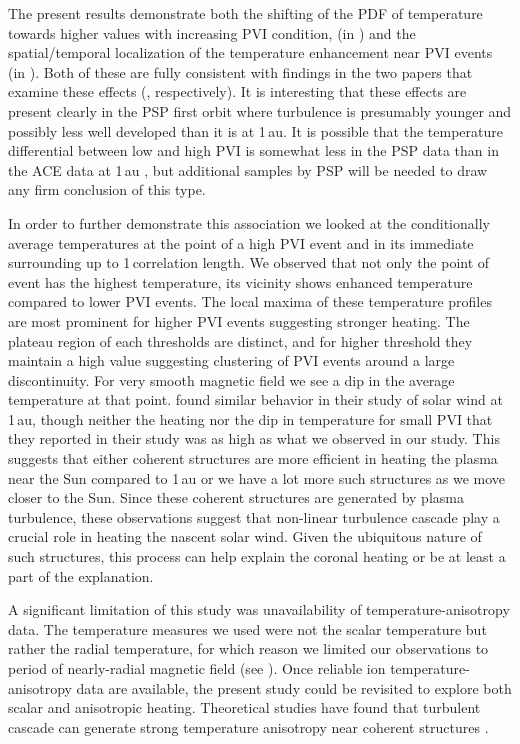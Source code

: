         The present results demonstrate both the shifting of the PDF of temperature towards higher
        values with increasing PVI condition, (in ) and the spatial/temporal
        localization of the temperature enhancement near PVI events (in ).
        Both of these are fully consistent with findings in the two papers that examine these
        effects (\citet{Osman2011, Osman2012}, respectively). It is interesting that these effects
        are present clearly in the PSP first orbit where turbulence is presumably younger and
        possibly less well developed than it is at 1\,au. It is possible that the temperature
        differential between low and high PVI is somewhat less in the PSP data than in the ACE data
        at 1\,au \citep{Osman2011}, but additional samples by PSP will be needed to draw any firm
        conclusion of this type.

        In order to further demonstrate this association we looked at the conditionally average
        temperatures at the point of a high PVI event and in its immediate surrounding up to
        1\,correlation length. We observed that not only the point of event has the highest
        temperature, its vicinity shows enhanced temperature compared to lower PVI events. The local
        maxima of these temperature profiles are most prominent for higher PVI events suggesting
        stronger heating. The plateau region of each thresholds are distinct, and for higher
        threshold they maintain a high value suggesting clustering of PVI events around a large
        discontinuity. For very smooth magnetic field we see a dip in the average temperature at
        that point. \citet{Osman2012a} found similar behavior in their study of solar wind at 1\,au,
        though neither the heating nor the dip in temperature for small PVI that they reported in
        their study was as high as what we observed in our study. This suggests that either coherent
        structures are more efficient in heating the plasma near the Sun compared to 1\,au or we
        have a lot more such structures as we move closer to the Sun. Since these coherent
        structures are generated by plasma turbulence, these observations suggest that non-linear
        turbulence cascade play a crucial role in heating the nascent solar wind. Given the
        ubiquitous nature of such structures, this process can help explain the coronal heating or
        be at least a part of the explanation.

        A significant limitation of this study was unavailability of temperature-anisotropy data.
        The temperature measures we used were not the scalar temperature but rather the radial
        temperature, for which reason we limited our observations to period of nearly-radial
        magnetic field (see ). Once reliable ion temperature-anisotropy data
        are available, the present study could be revisited to explore both scalar and anisotropic
        heating. Theoretical studies have found that turbulent cascade can generate strong
        temperature anisotropy near coherent structures \citep{Parashar2016}.

